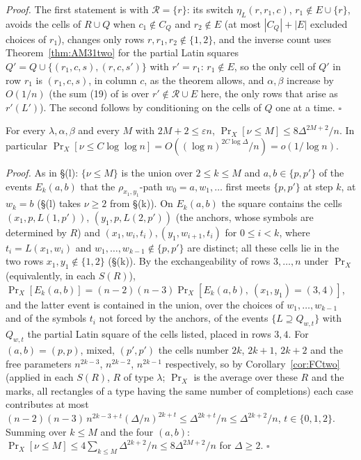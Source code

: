 \emph{Proof.}  The first statement is \cite[Lemma~4.1]{AM26} with
$\mathcal R=\{r\}$: its switch $\eta_L(r,r_1,c)$, $r_1\notin E\cup\{r\}$,
avoids the cells of $R\cup Q$ when $c_1\notin C_Q$ and $r_2\notin E$ (at
most $|C_Q|+|E|$ excluded choices of $r_1$), changes only rows
$r,r_1,r_2\notin\{1,2\}$, and the inverse count uses
Theorem~\ref{thm:AM31two} for the partial Latin squares
$Q'=Q\cup\{(r_1,c,s),(r,c,s')\}$ with $r'=r_1$: $r_1\notin E$, so the
only cell of $Q'$ in row $r_1$ is $(r_1,c,s)$, in column $c$, as the
theorem allows, and $\alpha,\beta$ increase by $O(1/n)$ (the sum (19) of
\cite{AM26} is over $r'\notin\mathcal R\cup E$ here, the only rows that
arise as $r'(L')$).  The second follows by
conditioning on the cells of $Q$ one at a time.  $\square$

\begin{corollary}\label{cor:nutail}
For every $\lambda,\alpha,\beta$ and every $M$ with $2M+2\le\varepsilon n$,
$\Pr_X[\nu\le M]\le8\Delta^{2M+2}/n$.  In particular
$\Pr_X[\nu\le C\log\log n]=O((\log n)^{2C\log\Delta}/n)=o(1/\log n)$.
\end{corollary}

\emph{Proof.}  As in \S(l): $\{\nu\le M\}$ is the union over $2\le k\le M$
and $a,b\in\{p,p'\}$ of the events $E_k(a,b)$ that the
$\rho_{x_1,y_1}$-path $w_0=a,w_1,\dots$ first meets $\{p,p'\}$ at step
$k$, at $w_k=b$ (\S(l) takes $\nu\ge2$ from \S(k)).  On $E_k(a,b)$ the
square contains the cells $(x_1,p,L(1,p'))$, $(y_1,p,L(2,p'))$ (the
anchors, whose symbols are determined by $R$) and
$(x_1,w_i,t_i),(y_1,w_{i+1},t_i)$ for $0\le i<k$, where $t_i=L(x_1,w_i)$
and $w_1,\dots,w_{k-1}\notin\{p,p'\}$ are distinct; all these cells lie
in the two rows $x_1,y_1\notin\{1,2\}$ (\S(k)).  By the exchangeability
of rows $3,\dots,n$ under $\Pr_X$ (equivalently, in each $S(R)$),
$\Pr_X[E_k(a,b)]=(n-2)(n-3)\Pr_X[E_k(a,b),\ (x_1,y_1)=(3,4)]$, and the
latter event is contained in the union, over the choices of
$w_1,\dots,w_{k-1}$ and of the symbols $t_i$ not forced by the anchors,
of the events $\{L\supseteq Q_{w,t}\}$ with $Q_{w,t}$ the partial Latin
square of the cells listed, placed in rows $3,4$.  For $(a,b)=(p,p)$,
mixed, $(p',p')$ the cells number $2k$, $2k+1$, $2k+2$ and the free
parameters $n^{2k-3}$, $n^{2k-2}$, $n^{2k-1}$ respectively, so by
Corollary~\ref{cor:FCtwo} (applied in each $S(R)$, $R$ of type
$\lambda$; $\Pr_X$ is the average over these $R$ and the marks, all
rectangles of a type having the same number of completions) each case
contributes at most $(n-2)(n-3)\,n^{2k-3+t}(\Delta/n)^{2k+t}\le\Delta^{2k+t}/n\le\Delta^{2k+2}/n$,
$t\in\{0,1,2\}$.  Summing over $k\le M$ and the four $(a,b)$:
$\Pr_X[\nu\le M]\le4\sum_{k\le M}\Delta^{2k+2}/n\le8\Delta^{2M+2}/n$ for
$\Delta\ge2$.  $\square$

